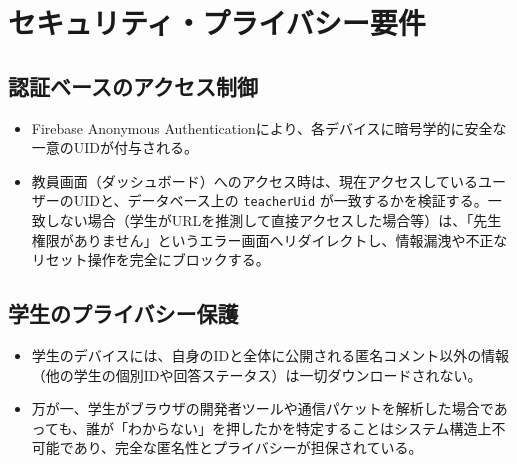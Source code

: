 \documentclass[11pt,a4paper]{jsarticle}
\begin{document}
\section{セキュリティ・プライバシー要件}

\subsection{認証ベースのアクセス制御}
\begin{itemize}
    \item Firebase Anonymous Authenticationにより、各デバイスに暗号学的に安全な一意のUIDが付与される。
    \item 教員画面（ダッシュボード）へのアクセス時は、現在アクセスしているユーザーのUIDと、データベース上の \texttt{teacherUid} が一致するかを検証する。一致しない場合（学生がURLを推測して直接アクセスした場合等）は、「先生権限がありません」というエラー画面へリダイレクトし、情報漏洩や不正なリセット操作を完全にブロックする。
\end{itemize}

\subsection{学生のプライバシー保護}
\begin{itemize}
    \item 学生のデバイスには、自身のIDと全体に公開される匿名コメント以外の情報（他の学生の個別IDや回答ステータス）は一切ダウンロードされない。
    \item 万が一、学生がブラウザの開発者ツールや通信パケットを解析した場合であっても、誰が「わからない」を押したかを特定することはシステム構造上不可能であり、完全な匿名性とプライバシーが担保されている。
\end{itemize}
\end{document}
